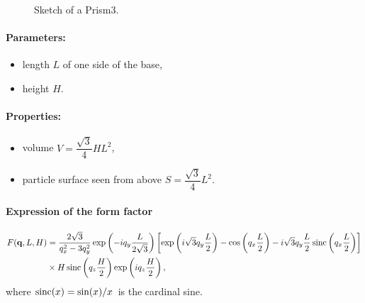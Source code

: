 \begin{figure}[ht]
\hfill
{}
\hfill
{}
\hfill
\caption{Sketch of a Prism3.}
\label{fig:prism3}
\end{figure}

\FloatBarrier

\paragraph{Parameters:}
\begin{itemize}
\item length $L$ of one side of the base, 
\item height $H$.
\end{itemize}

\paragraph{Properties:}
\begin{itemize}
\item volume $V= \dfrac{\sqrt{3}}{4} H L^2$,
\item particle surface seen from above $S =\dfrac{\sqrt{3}}{4}L^2$.

\end{itemize}

\paragraph{Expression of the form factor}
\begin{align*}
F(\mathbf{q},L, H) &= \frac{2 \sqrt{3}}{q_x^2-3q_y^2}  \exp\left(-i q_y\frac{L}{2\sqrt{3}}\right)\left[\exp\left(i \sqrt{3} q_y \frac{L}{2} \right)-\cos\left(q_x \frac{L}{2}\right)-i \sqrt{3} q_y \frac{L}{2} \operatorname{sinc}\left(q_x \frac{L}{2}\right) \right] \\
  &
\times  H \operatorname{sinc}\left(q_z \frac{H}{2} \right) \exp\left(i q_z \frac{H}{2}\right),
\end{align*}
where $\operatorname{sinc}(x)=\sin(x)/x$ is the cardinal sine.

